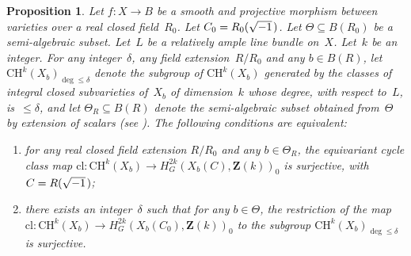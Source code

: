 \documentclass[JEP,XML,SOM,Unicode]{cedram}
\theoremstyle{plain}
\newtheorem{prop}[thm]{Proposition}
\theoremstyle{definition}
\numberwithin{equation}{section}
\newcommand{\cl}{{\mathrm{cl}}}
\newcommand{\Z}{{\mathbf Z}}
\newcommand{\CH}{\mathrm{CH}}
\begin{document}
\begin{prop}
\label{prop:ihcnonarchbounded}
Let $f:X\to B$ be a smooth and projective morphism between varieties over a real closed field~$R_0$.
Let $C_0=R_0(\sqrt{-1}\mkern2mu)$.
Let $\Theta \subseteq B(R_0)$ be a semi-algebraic subset.
Let~$L$ be a relatively ample line bundle on~$X$.
Let~$k$ be an integer.
For any integer~$\delta$, any field extension~$R/R_0$ and any $b \in B(R)$,
let $\CH^k(X_b)_{\deg\leq \delta}$ denote the subgroup of $\CH^k(X_b)$ generated by
the classes of integral closed subvarieties of~$X_b$ of dimension~$k$ whose degree,
with respect to~$L$, is~$\leq\delta$,
and let $\Theta_R \subseteq B(R)$ denote the semi-algebraic subset
obtained from~$\Theta$ by extension of scalars (see \cite[]{delfsknebuschonthehomology}).
The following conditions are equivalent:
\begin{enumerate}
\item\label{prop:ihcnonarchboundedi} for any real closed field extension $R/R_0$ and any $b\in \Theta_R$, the
equivariant cycle class map
$\cl:\CH^k(X_b) \to H^{2k}_G(X_b(C),\Z(k))_0$
is surjective, with $C=R(\sqrt{-1}\mkern2mu)$;
\item\label{prop:ihcnonarchboundedii} there exists an integer~$\delta$ such that for any $b\in \Theta$,
the restriction of the map
$\cl:\CH^k(X_b) \to H^{2k}_G(X_b(C_0),\Z(k))_0$
to the subgroup $\CH^k(X_b)_{\deg\leq\delta}$
is surjective.
\end{enumerate}
\end{prop}
\end{document}
